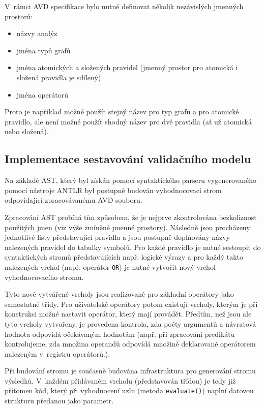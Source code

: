 V~rámci AVD specifikace bylo nutné definovat několik nezávislých jmenných prostorů:

\begin{itemize}
\item názvy analýz
\item jména typů grafů
\item jména atomických a složených pravidel (jmenný prostor pro atomická i složená pravidla je sdílený)
\item jména operátorů
\end{itemize}

Proto je například možné použít stejný název pro typ grafu a pro atomické pravidlo, ale není možné použít shodný název pro dvě pravidla (ať už atomická nebo složená).

\subsection{Implementace sestavování validačního modelu}
Na základě AST, který byl získán pomocí syntaktického parseru vygenerovaného pomocí nástroje ANTLR byl postupně budován vyhodnocovací strom odpovídající zpracovávanému AVD souboru.

Zpracování AST probíhá tím způsobem, že je nejprve zkontrolována bezkoliznost použitých jmen (viz výše zmíněné jmenné prostory). Následně jsou procházeny jednotlivé listy představující pravidla a jsou postupně doplňovány názvy nalezených pravidel do tabulky symbolů. Pro každé pravidlo je nutné sestoupit do syntaktických stromů představujících např. logické výrazy a pro každý takto nalezených vrchol (např. operátor \verb+OR+) je nutné vytvořit nový vrchol vyhodnocovacího stromu.

Tyto nově vytvářené vrcholy jsou realizované pro základní operátory jako samostatné třídy. Pro uživatelské operátory potom existují vrcholy, kterým je při konstrukci možné nastavit operátor, který mají provádět. Předtím, než jsou ale tyto vrcholy vytvořeny, je provedena kontrola, zda počty argumentů a návratová hodnota odpovídá očekávaným hodnotám (např. při zpracování predikátu kontrolujeme, zda množina operandů odpovídá množině deklarované operátorem nalezeným v~registru operátorů.).

Při budování stromu je současně budována infrastruktura pro generování stromu výsledků. V~každém přidávaném vrcholu (představován třídou) je tedy již přítomen kód, který při vyhodnocení uzlu (metoda \verb-evaluate()-) naplní datovou strukturu předanou jako parametr.

